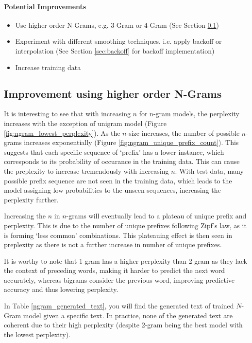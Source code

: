\paragraph{Potential Improvements}
\begin{itemize}
    \item Use higher order N-Grams, e.g. 3-Gram or 4-Gram (See Section \ref{subsec:improvement-ngrams})
    \item Experiment with different smoothing techniques, i.e. apply backoff or interpolation (See Section \ref{sec:backoff} for backoff implementation)
    \item Increase training data
\end{itemize}


\subsection{Improvement using higher order N-Grams}\label{subsec:improvement-ngrams}
It is interesting to see that with increasing $n$ for n-gram models, the perplexity increases with the exception of unigram model (Figure \ref{fig:ngram_lowest_perplexity}). 
As the $n$-size increases, the number of possible $n$-grams increases exponentially (Figure \ref{fig:ngram_unique_prefix_count}).
This suggests that each specific sequence of `prefix' has a lower instance, which corresponds to its probability of occurance in the training data. 
This can cause the preplexity to increase tremendously with increasing $n$.
With test data, many possible prefix sequence are not seen in the training data, which leads to the model assigning low probabilities to the unseen sequences, increasing the perplexity further.

Increasing the $n$ in $n$-grams will eventually lead to a plateau of unique prefix and perplexity.
This is due to the number of unique prefixes following Zipf's law, as it is forming `less common' combinations. 
This plateauing effect is then seen in preplexity as there is not a further increase in number of unique prefixes. 

It is worthy to note that 1-gram has a higher perplexity than 2-gram as they lack the context of preceding words, making it harder to predict the next word accurately, whereas bigrams consider the previous word, improving predictive accuracy and thus lowering perplexity.

In Table \ref{ngram_generated_text}, you will find the generated text of trained $N$-Gram model given a specific text. 
In practice, none of the generated text are coherent due to their high perplexity (despite 2-gram being the best model with the lowest perplexity).

